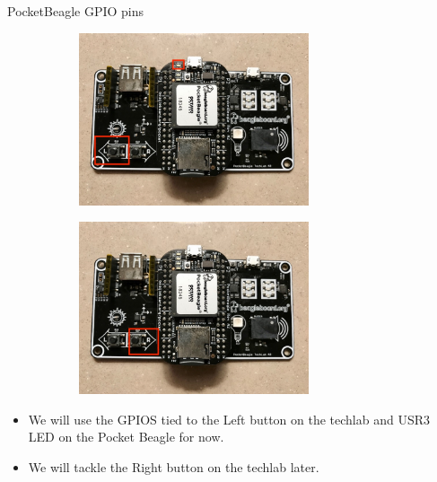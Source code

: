 \begin{frame}
   {PocketBeagle GPIO pins}
   \begin{figure}[H]
      \centering
      \begin{subfigure}{0.4\textwidth}
         \centering
         \includegraphics[height=2in]{IMAGES/techlab-Lbutton}
      \end{subfigure}
      \begin{subfigure}{0.4\textwidth}
         \centering
         \includegraphics[height=2in]{IMAGES/techlab-Rbutton}
      \end{subfigure}
   \end{figure}
   \begin{itemize}
      \item We will use the GPIOS tied to the Left button on the techlab
              and USR3 LED on the Pocket Beagle for now.
      \item We will tackle the Right button on the techlab later.
   \end{itemize}
\end{frame}

\cprotect\note{

}

